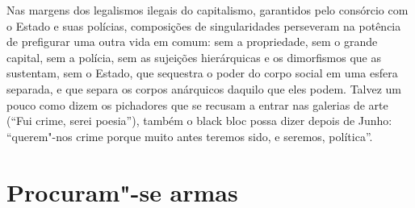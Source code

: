 Nas margens dos legalismos ilegais do capitalismo, garantidos pelo
consórcio com o Estado e suas polícias, composições de singularidades
perseveram na potência de prefigurar uma outra vida em comum: sem a
propriedade, sem o grande capital, sem a polícia, sem as sujeições
hierárquicas e os dimorfismos que as sustentam, sem o Estado, que
sequestra o poder do corpo social em uma esfera separada, e que separa
os corpos anárquicos daquilo que eles podem. Talvez um pouco como dizem
os pichadores que se recusam a entrar nas galerias de arte (``Fui crime,
serei poesia''), também o black bloc possa dizer depois de Junho:
``querem"-nos crime porque muito antes teremos sido, e seremos,
política''.

\chapter{Procuram"-se armas}

